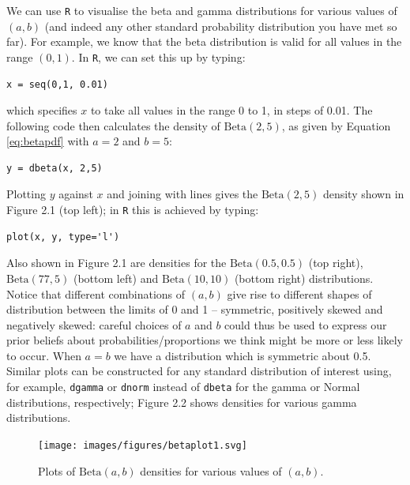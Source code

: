 \noindent We can use \texttt{R} to visualise the beta and gamma distributions for various values of $(a,b)$ (and indeed any other standard probability distribution you have met so far).  For example, we know that the beta distribution is valid for all values in the range $(0,1)$.  In \texttt{R}, we can set this up by typing:
\begin{verbatim}
x = seq(0,1, 0.01)
\end{verbatim}
which specifies $x$ to take all values in the range 0 to 1, in steps of 0.01.  The following code then calculates the density of $\text{Beta}(2,5)$, as given by Equation \eqref{eq:betapdf} with $a=2$ and $b=5$:
\begin{verbatim}
y = dbeta(x, 2,5)
\end{verbatim}
Plotting $y$ against $x$ and joining with lines gives the $\text{Beta}(2,5)$ density shown in Figure 2.1 (top left); in \texttt{R} this is achieved by typing:
\begin{verbatim}
plot(x, y, type='l')
\end{verbatim}
\noindent Also shown in Figure 2.1 are densities for the $\text{Beta}(0.5,0.5)$ (top right), $\text{Beta}(77,5)$ (bottom left) and  $\text{Beta}(10,10)$ (bottom right) distributions.  Notice that different combinations of $(a,b)$ give rise to different shapes of distribution between the limits of 0 and 1 -- symmetric, positively skewed and negatively skewed: careful choices of $a$ and $b$ could thus be used to express our prior beliefs about probabilities/proportions we think might be more or less likely to occur.  When $a=b$ we have a distribution which is symmetric about 0.5.  Similar plots can be constructed for any standard distribution of interest using, for example, \texttt{dgamma} or \texttt{dnorm} instead of \texttt{dbeta} for the gamma or Normal distributions, respectively; Figure 2.2 shows densities for various gamma distributions.\begin{figure}[!h]
\centering
\texttt{[image: images/figures/betaplot1.svg]}
\caption{Plots of $\text{Beta}(a,b)$ densities for various values of $(a,b)$.}
\end{figure}

\newpage

